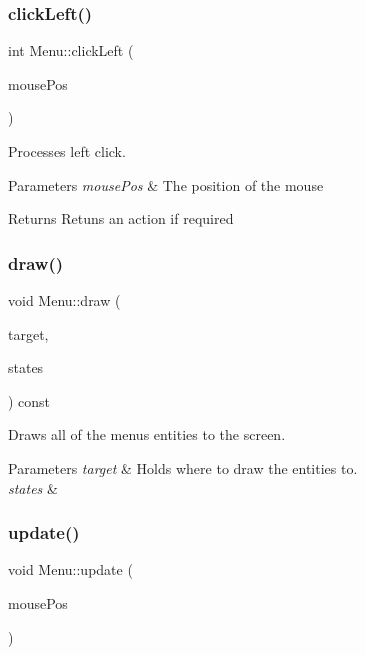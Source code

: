 \subsubsection{\texorpdfstring{click\+Left()}{clickLeft()}}
{\footnotesize\ttfamily int Menu\+::click\+Left (\begin{DoxyParamCaption}\item[{sf\+::\+Vector2i}]{mouse\+Pos }\end{DoxyParamCaption})}



Processes left click. 


\begin{DoxyParams}{Parameters}
{\em mouse\+Pos} & The position of the mouse \\
\hline
\end{DoxyParams}
\begin{DoxyReturn}{Returns}
Retuns an action if required 
\end{DoxyReturn}
\mbox{\label{class_menu_aa0e69963ee402f3559680e5a691b03fd}} 
\subsubsection{\texorpdfstring{draw()}{draw()}}
{\footnotesize\ttfamily void Menu\+::draw (\begin{DoxyParamCaption}\item[{sf\+::\+Render\+Target \&}]{target,  }\item[{sf\+::\+Render\+States}]{states }\end{DoxyParamCaption}) const\hspace{0.3cm}{\ttfamily [private]}}



Draws all of the menu\textquotesingle{}s entities to the screen. 


\begin{DoxyParams}{Parameters}
{\em target} & Holds where to draw the entities to. \\
\hline
{\em states} & \\
\hline
\end{DoxyParams}
\mbox{\label{class_menu_a67abbf2a4f0588e19290b62fbdc690a3}} 
\subsubsection{\texorpdfstring{update()}{update()}}
{\footnotesize\ttfamily void Menu\+::update (\begin{DoxyParamCaption}\item[{sf\+::\+Vector2i}]{mouse\+Pos }\end{DoxyParamCaption})}



